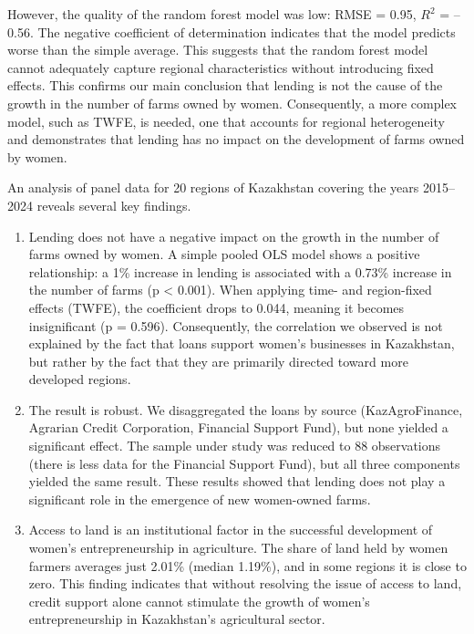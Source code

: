 \documentclass[pdflatex,sn-mathphys-ay]{sn-jnl}
\begin{document}
However, the quality of the random forest model was low: RMSE = 0.95, $R^2$
= --0.56. The negative coefficient of determination indicates that the
model predicts worse than the simple average. This suggests that the
random forest model cannot adequately capture regional characteristics
without introducing fixed effects. This confirms our main conclusion
that lending is not the cause of the growth in the number of farms owned
by women. Consequently, a more complex model, such as TWFE, is needed,
one that accounts for regional heterogeneity and demonstrates that
lending has no impact on the development of farms owned by women.

An analysis of panel data for 20 regions of Kazakhstan covering the
years 2015--2024 reveals several key findings.

\begin{enumerate}
\item Lending does not have a negative impact on the growth in the number
of farms owned by women. A simple pooled OLS model shows a positive
relationship: a 1\% increase in lending is associated with a 0.73\%
increase in the number of farms (p \textless{} 0.001). When applying
time- and region-fixed effects (TWFE), the coefficient drops to 0.044,
meaning it becomes insignificant (p = 0.596). Consequently, the
correlation we observed is not explained by the fact that loans support
women's businesses in Kazakhstan, but rather by the fact that they are
primarily directed toward more developed regions.

\item The result is robust. We disaggregated the loans by source
(KazAgroFinance, Agrarian Credit Corporation, Financial Support Fund),
but none yielded a significant effect. The sample under study was
reduced to 88 observations (there is less data for the Financial Support
Fund), but all three components yielded the same result. These results
showed that lending does not play a significant role in the emergence of
new women-owned farms.

\item Access to land is an institutional factor in the successful
development of women's entrepreneurship in agriculture. The share of
land held by women farmers averages just 2.01\% (median 1.19\%), and in
some regions it is close to zero. This finding indicates that without
resolving the issue of access to land, credit support alone cannot
stimulate the growth of women's entrepreneurship in Kazakhstan's
agricultural sector.


\end{enumerate}
\end{document}
